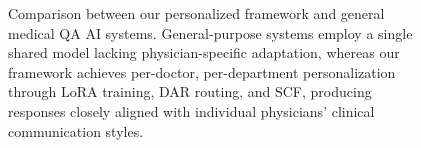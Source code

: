 \begin{figure}[!t]
\caption{Comparison between our personalized framework and general medical QA AI systems. General-purpose systems employ a single shared model lacking physician-specific adaptation, whereas our framework achieves per-doctor, per-department personalization through LoRA training, DAR routing, and SCF, producing responses closely aligned with individual physicians' clinical communication styles.}
\label{fig:comparison}
\end{figure}
